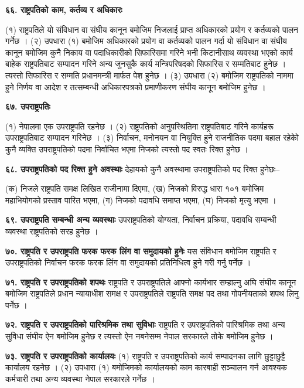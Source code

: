 \textbf{६६. राष्ट्रपतिको काम, कर्तव्य र अधिकारः}

(१) राष्ट्रपतिले यो संविधान वा संघीय कानून बमोजिम निजलाई प्राप्त अधिकारको प्रयोग र कर्तव्यको पालन
गर्नेछ ।
(२) उपधारा (१) बमोजिम अधिकारको प्रयोग वा कर्तव्यको पालन गर्दा यो संविधान वा संघीय कानून बमोजिम कुनै निकाय वा पदाधिकारीको सिफारिसमा गरिने भनी किटानीसाथ व्यवस्था भएको कार्य बाहेक राष्ट्रपतिबाट सम्पादन गरिने अन्य जुनसुकै कार्य मन्त्रिपरिषदको सिफारिस र सम्मतिबाट हुनेछ । त्यस्तो सिफारिस र सम्मति प्रधानमन्त्री मार्फत पेश हुनेछ ।
(३) उपधारा (२) बमोजिम राष्ट्रपतिको नाममा हुने निर्णय वा आदेश र तत्सम्बन्धी अधिकारपत्रको प्रमाणीकरण संघीय कानून बमोजिम हुनेछ ।

\textbf{६७. उपराष्ट्रपतिः}

(१) नेपालमा एक उपराष्ट्रपति रहनेछ ।
(२) राष्ट्रपतिको अनुपस्थितिमा राष्ट्रपतिबाट गरिने कार्यहरू उपराष्ट्रपतिबाट सम्पादन गरिनेछ ।
(३) निर्वाचन, मनोनयन वा नियुक्ति हुने राजनीतिक पदमा बहाल रहेकोे कुनै व्यक्ति उपराष्ट्रपतिको पदमा निर्वाचित भएमा निजको त्यस्तो पद स्वतः रिक्त हुनेछ ।

\textbf{६८. उपराष्ट्रपतिको पद रिक्त हुने अवस्थाः} देहायको कुनै अवस्थामा उपराष्ट्रपतिको पद रिक्त हुनेछः–

(क) निजले राष्ट्रपति समक्ष लिखित राजीनामा दिएमा,
(ख) निजको विरुद्ध धारा १०१ बमोजिम महाभियोगको प्रस्ताव पारित भएमा,
(ग) निजको पदावधि समाप्त भएमा,
(घ) निजको मृत्यु भएमा ।

\textbf{६९. उपराष्ट्रपति सम्बन्धी अन्य व्यवस्थाः} उपराष्ट्रपतिको योग्यता, निर्वाचन प्रक्रिया, पदावधि सम्बन्धी व्यवस्था राष्ट्रपतिको सरह हुनेछ ।

\textbf{७०. राष्ट्रपति र उपराष्ट्रपति फरक फरक लिंग वा समुदायको हुनेः} यस संविधान बमोजिम राष्ट्रपति र उपराष्ट्रपतिको निर्वाचन फरक फरक लिंग वा समुदायको प्रतिनिधित्व हुने गरी गर्नु पर्नेछ ।

\textbf{७१. राष्ट्रपति र उपराष्ट्रपतिको शपथः} राष्ट्रपति र उपराष्ट्रपतिले आफ्नो कार्यभार सम्हाल्नु अघि संघीय कानून बमोजिम राष्ट्रपतिले प्रधान न्यायाधीश समक्ष र उपराष्ट्रपतिले राष्ट्रपति समक्ष पद तथा गोपनीयताको शपथ लिनु पर्नेछ ।

\textbf{७२. राष्ट्रपति र उपराष्ट्रपतिको पारिश्रमिक तथा सुविधाः} राष्ट्रपति र उपराष्ट्रपतिको पारिश्रमिक तथा अन्य सुविधा संघीय ऐन बमोजिम हुनेछ र त्यस्तो ऐन नबनेसम्म नेपाल सरकारले तोके बमोजिम हुनेछ ।

\textbf{७३. राष्ट्रपति र उपराष्ट्रपतिको कार्यालयः} (१) राष्ट्रपति र उपराष्ट्रपतिको कार्य सम्पादनका लागि छुट्टाछुट्टै कार्यालय रहनेछ ।
(२) उपधारा (१) बमोजिमको कार्यालयको काम कारबाही सञ्चालन गर्न आवश्यक कर्मचारी तथा अन्य व्यवस्था नेपाल सरकारले गर्नेछ ।